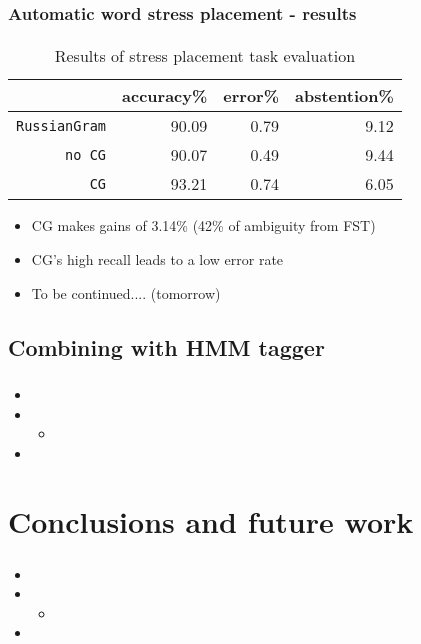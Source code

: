 \documentclass{beamer}
\begin{document}
\begin{frame}
\frametitle{Automatic word stress placement - results}
\framesubtitle{}
\begin{table}
  \centering
  \begin{tabular}{r | r r r }
     & accuracy\% & error\% & abstention\%  \\
    \hline
    \hline
    {\small {\tt RussianGram}} & 90.09 & 0.79 & 9.12 \\
    {\small {\tt no CG}} & 90.07 & 0.49 & 9.44  \\
    {\small {\tt CG}} & 93.21 & 0.74 & 6.05
  \end{tabular}
  \caption{Results of stress placement task evaluation}
  \label{tab:results}
\end{table}
\begin{itemize}
	\item CG makes gains of 3.14\% (42\% of ambiguity from FST)
	\pause
	\item CG's high recall leads to a low error rate
	\pause
	\item To be continued.... (tomorrow)
\end{itemize}
\end{frame}


\subsection{Combining with HMM tagger} %

\begin{frame}
\frametitle{}
\framesubtitle{}
\begin{itemize}
	\item 
	\pause
	\item 
	\begin{itemize}
		\item 
		\pause
	\end{itemize}
	\item 
\end{itemize}
\end{frame}

\section{Conclusions and future work} %
\begin{frame}
\frametitle{}
\framesubtitle{}
\begin{itemize}
	\item 
	\pause
	\item 
	\begin{itemize}
		\item 
		\pause
	\end{itemize}
	\item 
\end{itemize}
\end{frame}


\begin{tiny}

\end{tiny}
\end{document}
